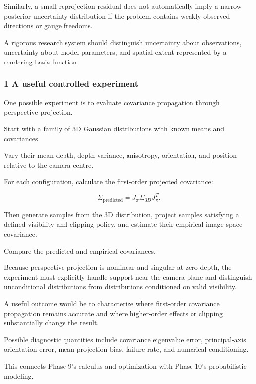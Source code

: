 Similarly, a small reprojection residual does not automatically imply a narrow posterior uncertainty distribution if the problem contains weakly observed directions or gauge freedoms.

A rigorous research system should distinguish uncertainty about observations, uncertainty about model parameters, and spatial extent represented by a rendering basis function.

\subsubsection{1 A useful controlled experiment}\label{02-foundations-ii-ch031-a-useful-controlled-experiment}

\hypertarget{02-foundations-ii-ch031-a-useful-controlled-experiment}{}

One possible experiment is to evaluate covariance propagation through perspective projection.

Start with a family of 3D Gaussian distributions with known means and covariances.

Vary their mean depth, depth variance, anisotropy, orientation, and position relative to the camera centre.

For each configuration, calculate the first-order projected covariance:

\[
 \Sigma_{\mathrm{predicted}} = J_\pi\Sigma_{3D}J_\pi^T.
\]

Then generate samples from the 3D distribution, project samples satisfying a defined visibility and clipping policy, and estimate their empirical image-space covariance.

Compare the predicted and empirical covariances.

Because perspective projection is nonlinear and singular at zero depth, the experiment must explicitly handle support near the camera plane and distinguish unconditional distributions from distributions conditioned on valid visibility.

A useful outcome would be to characterize where first-order covariance propagation remains accurate and where higher-order effects or clipping substantially change the result.

Possible diagnostic quantities include covariance eigenvalue error, principal-axis orientation error, mean-projection bias, failure rate, and numerical conditioning.

This connects Phase 9's calculus and optimization with Phase 10's probabilistic modeling.

